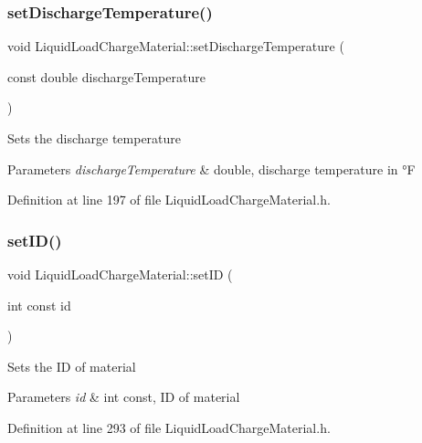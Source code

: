 \subsubsection{\texorpdfstring{set\+Discharge\+Temperature()}{setDischargeTemperature()}}
{\footnotesize\ttfamily void Liquid\+Load\+Charge\+Material\+::set\+Discharge\+Temperature (\begin{DoxyParamCaption}\item[{const double}]{discharge\+Temperature }\end{DoxyParamCaption})\hspace{0.3cm}{\ttfamily [inline]}}

Sets the discharge temperature 
\begin{DoxyParams}{Parameters}
{\em discharge\+Temperature} & double, discharge temperature in °F \\
\hline
\end{DoxyParams}


Definition at line 197 of file Liquid\+Load\+Charge\+Material.\+h.

\mbox{\label{class_liquid_load_charge_material_a192946f14996795396354f3e15b9e30b}} 
\subsubsection{\texorpdfstring{set\+I\+D()}{setID()}}
{\footnotesize\ttfamily void Liquid\+Load\+Charge\+Material\+::set\+ID (\begin{DoxyParamCaption}\item[{int const}]{id }\end{DoxyParamCaption})\hspace{0.3cm}{\ttfamily [inline]}}

Sets the ID of material 
\begin{DoxyParams}{Parameters}
{\em id} & int const, ID of material \\
\hline
\end{DoxyParams}


Definition at line 293 of file Liquid\+Load\+Charge\+Material.\+h.

\mbox{\label{class_liquid_load_charge_material_ac30600ef82db69934e8c08e4a774bb03}} 
